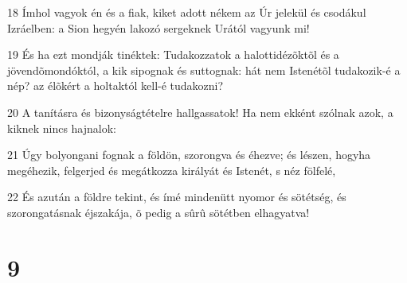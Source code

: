 \par 18 Ímhol vagyok én és a fiak, kiket adott nékem az Úr jelekül és csodákul Izráelben: a Sion hegyén lakozó sergeknek Urától vagyunk mi!
\par 19 És ha ezt mondják tinéktek: Tudakozzatok a halottidézõktõl és a jövendõmondóktól, a kik sipognak és suttognak: hát nem Istenétõl tudakozik-é a nép?  az élõkért a holtaktól kell-é tudakozni?
\par 20 A tanításra és bizonyságtételre hallgassatok! Ha nem ekként szólnak azok, a kiknek nincs hajnalok:
\par 21 Úgy bolyongani fognak a földön, szorongva és éhezve; és lészen, hogyha megéhezik, felgerjed és megátkozza királyát és Istenét, s néz fölfelé,
\par 22 És azután a földre tekint, és ímé mindenütt nyomor és sötétség, és szorongatásnak éjszakája, õ pedig a sûrû sötétben elhagyatva!

\chapter{9}


